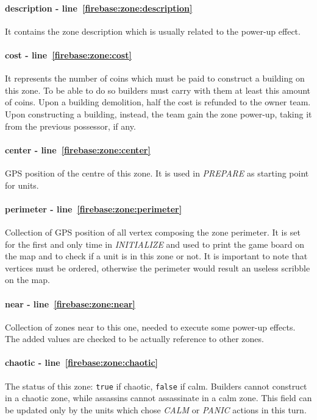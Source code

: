 				\paragraph{description - line~\ref{firebase:zone:description}}
				It contains the zone description which is usually related to the power-up effect.
				
				\paragraph{cost - line~\ref{firebase:zone:cost}}
				It represents the number of coins which must be paid to construct a building on this zone. To be able to do so builders must carry with them at least this amount of coins. Upon a building demolition, half the cost is refunded to the owner team. Upon constructing a building, instead, the team gain the zone power-up, taking it from the previous possessor, if any.
				
				\paragraph{center - line~\ref{firebase:zone:center}}
				GPS position of the centre of this zone. It is used in \emph{PREPARE} as starting point for units.
				
				\paragraph{perimeter - line~\ref{firebase:zone:perimeter}}
				Collection of GPS position of all vertex composing the zone perimeter. It is set for the first and only time in \emph{INITIALIZE} and used to print the game board on the map and to check if a unit is in this zone or not. It is important to note that vertices must be ordered, otherwise the perimeter would result an useless scribble on the map.
				
				\paragraph{near - line~\ref{firebase:zone:near}}
				Collection of zones near to this one, needed to execute some power-up effects.
				The added values are checked to be actually reference to other zones.
				
				\paragraph{chaotic - line~\ref{firebase:zone:chaotic}}
				The status of this zone: \lstinline|true| if chaotic, \lstinline|false| if calm. Builders cannot construct in a chaotic zone, while assassins cannot assassinate in a calm zone. This field can be updated only by the units which chose \emph{CALM} or \emph{PANIC} actions in this turn.
				
